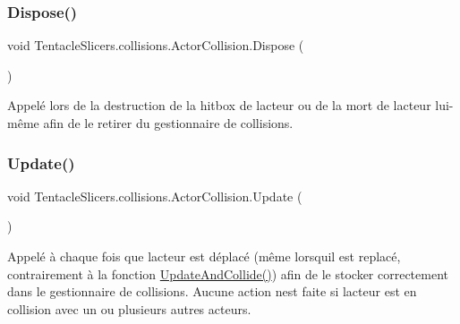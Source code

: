 \subsubsection{\texorpdfstring{Dispose()}{Dispose()}}
{\footnotesize\ttfamily void Tentacle\+Slicers.\+collisions.\+Actor\+Collision.\+Dispose (\begin{DoxyParamCaption}{ }\end{DoxyParamCaption})}



Appelé lors de la destruction de la hitbox de l\textquotesingle{}acteur ou de la mort de l\textquotesingle{}acteur lui-\/même afin de le retirer du gestionnaire de collisions. 

\mbox{\label{class_tentacle_slicers_1_1collisions_1_1_actor_collision_a947c3ad0a5857b93b32c2259c34e7410}} 
\subsubsection{\texorpdfstring{Update()}{Update()}}
{\footnotesize\ttfamily void Tentacle\+Slicers.\+collisions.\+Actor\+Collision.\+Update (\begin{DoxyParamCaption}{ }\end{DoxyParamCaption})}



Appelé à chaque fois que l\textquotesingle{}acteur est déplacé (même lorsqu\textquotesingle{}il est replacé, contrairement à la fonction \hyperlink{class_tentacle_slicers_1_1collisions_1_1_actor_collision_a46c2289d3374b5e04ab40b81955e1a8e}{Update\+And\+Collide()}) afin de le stocker correctement dans le gestionnaire de collisions. Aucune action n\textquotesingle{}est faite si l\textquotesingle{}acteur est en collision avec un ou plusieurs autres acteurs. 

\mbox{\label{class_tentacle_slicers_1_1collisions_1_1_actor_collision_a46c2289d3374b5e04ab40b81955e1a8e}} 
